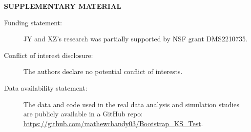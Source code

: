 \documentclass[12pt]{article}
\begin{document}
\bigskip
\begin{center}
{\large\bf SUPPLEMENTARY MATERIAL}
\end{center}

\begin{description}

\item[Funding statement:]JY and XZ's research was partially supported by NSF grant
DMS2210735.

\item[Conflict of interest disclosure:]The authors declare no potential conflict
of interests.

\item[Data availability statement:] The data and code used in the real data analysis and simulation
studies are publicly available in a GitHub repo:\\
\url{https://github.com/mathewchandy03/Bootstrap_KS_Test}.

\end{description}



\end{document}

